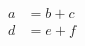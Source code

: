 \documentclass{article}
\begin{document}
\begin{align}
a &= b+c \\
d &= e+f
\end{align}
\end{document}
